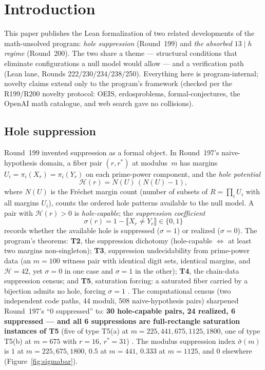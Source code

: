\documentclass[11pt,a4paper]{article}
\theoremstyle{definition}
\begin{document}
\section{Introduction}

This paper publishes the Lean formalization of two related developments
of the math-unsolved program: \emph{hole suppression} (Round~199) and
\emph{the absorbed $13\mid h$ regime} (Round~200). The two share a
theme --- structural conditions that eliminate configurations a null
model would allow --- and a verification path (Lean lane, Rounds
222/230/234/238/250). Everything here is program-internal; novelty
claims extend only to the program's framework (checked per the
R199/R200 novelty protocol: OEIS, erdosproblems, formal-conjectures,
the OpenAI math catalogue, and web search gave no collisions).

\subsection{Hole suppression}

Round~199 invented suppression as a formal object. In Round~197's
naive-hypothesis domain, a fiber pair $(r,r^*)$ at modulus~$m$ has
margins $U_i=\pi_i(X_r)=\pi_i(Y_r)$ on each prime-power component, and
the \emph{hole potential}
\begin{equation}
  \label{eq:holepotential}
  \mathcal{H}(r) = N(U)\,(N(U)-1),
\end{equation}
where $N(U)$ is the Fr\'echet margin count (number of subsets of
$R=\prod_i U_i$ with all margins $U_i$), counts the ordered
hole patterns available to the null model. A pair with
$\mathcal{H}(r)>0$ is \emph{hole-capable}; the
\emph{suppression coefficient}
\begin{equation}
  \label{eq:sigma}
  \sigma(r) = 1-\llbracket X_r\ne Y_r\rrbracket\in\{0,1\}
\end{equation}
records whether the available hole is suppressed ($\sigma=1$) or
realized ($\sigma=0$). The program's theorems: \textbf{T2}, the
suppression dichotomy (hole-capable $\iff$ at least two margins
non-singleton); \textbf{T3}, suppression undecidability from
prime-power data (an $m=100$ witness pair with identical digit sets,
identical margins, and $\mathcal{H}=42$, yet $\sigma=0$ in one case and
$\sigma=1$ in the other); \textbf{T4}, the chain-data suppression
census; and \textbf{T5}, saturation forcing: a saturated fiber carried
by a bijection admits no hole, forcing $\sigma=1$
\cite{D199}. The computational census (two independent code paths, 44
moduli, 508 naive-hypothesis pairs) sharpened Round~197's ``$0$
suppressed'' to: \textbf{30 hole-capable pairs, 24 realized, 6
suppressed --- and all 6 suppressions are full-rectangle saturation
instances of T5} (five of type T5(a) at $m=225,441,675,1125,1800$,
one of type T5(b) at $m=675$ with $r=16$, $r^*=31$) \cite{D199}.
The modulus suppression index $\bar\sigma(m)$ is $1$ at
$m=225,675,1800$, $0.5$ at $m=441$, $0.333$ at $m=1125$, and $0$
elsewhere (Figure~\ref{fig:sigmabar}).
\end{document}
